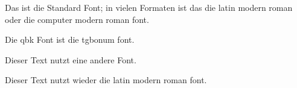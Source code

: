 \documentclass[a6paper]{article}
\begin{document}
Das ist die Standard Font; in vielen Formaten ist das die
latin modern roman oder die computer modern roman font.

{\selectfont Die qbk Font ist die tgbonum font.}

{\selectfont Dieser Text nutzt eine andere Font.}

{\selectfont Dieser Text nutzt wieder die latin modern roman font.}
\end{document}
